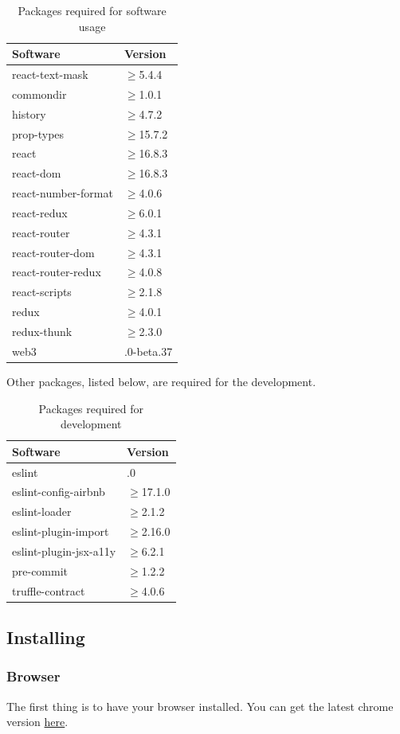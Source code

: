 \renewcommand{\arraystretch}{1.5}
\begin{longtable}{ 
		>{\centering}p{} 
		>{\centering}p{}
	}
	\caption{Packages required for software usage}\\
	\rowcolorhead
	\textbf{\color{white}Software} & 
	\textbf{\color{white}Version}
	\tabularnewline  
	\endhead	
	


	react-text-mask & $\geq$5.4.4
	\tabularnewline
	commondir &$\geq$1.0.1
	\tabularnewline
	history &$\geq$4.7.2
	\tabularnewline
	prop-types &$\geq$15.7.2\tabularnewline
	react &$\geq$16.8.3\tabularnewline
	react-dom &$\geq$16.8.3\tabularnewline
	react-number-format &$\geq$4.0.6\tabularnewline
	react-redux &$\geq$6.0.1\tabularnewline
	react-router &$\geq$4.3.1\tabularnewline
	react-router-dom &$\geq$4.3.1\tabularnewline
	react-router-redux &$\geq$4.0.8\tabularnewline
	react-scripts &$\geq$2.1.8\tabularnewline
	redux &$\geq$4.0.1\tabularnewline
	redux-thunk &$\geq$2.3.0\tabularnewline
	web3 & 1.0.0-beta.37\tabularnewline
	
\end{longtable}

Other packages, listed below, are required for the development.
\renewcommand{\arraystretch}{1.5}
\begin{longtable}{ 
		>{\centering}p{} 
		>{\centering}p{}
	}
	\caption{Packages required for development}\\
	\rowcolorhead
	\textbf{\color{white}Software} & 
	\textbf{\color{white}Version}
	\tabularnewline  
	\endhead	
	
	eslint & 5.12.0\tabularnewline
	eslint-config-airbnb &$\geq$17.1.0\tabularnewline
	eslint-loader & $\geq$2.1.2\tabularnewline
	eslint-plugin-import & $\geq$2.16.0\tabularnewline
	eslint-plugin-jsx-a11y & $\geq$6.2.1\tabularnewline
	pre-commit & $\geq$1.2.2\tabularnewline
	truffle-contract & $\geq$4.0.6
	
\end{longtable}

\subsection{Installing}
\subsubsection{Browser}
The first thing is to have your browser installed. You can get the latest chrome version  \href{https://www.google.com/chrome/}{here}.\\

